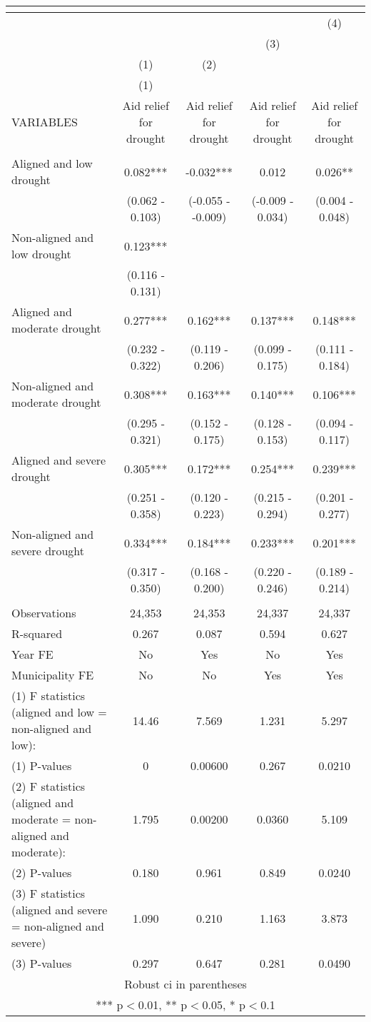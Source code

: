 \begin{tabular}{lcccc}
\multicolumn{5}{c}{} \\ \hline
 &  &  &  & (4) \\
 &  &  & (3) &  \\
 & (1) & (2) &  &  \\
 & (1) &  &  &  \\
VARIABLES & Aid relief for drought & Aid relief for drought & Aid relief for drought & Aid relief for drought \\ \hline
 &  &  &  &  \\
Aligned and low drought & 0.082*** & -0.032*** & 0.012 & 0.026** \\
 & (0.062 - 0.103) & (-0.055 - -0.009) & (-0.009 - 0.034) & (0.004 - 0.048) \\
Non-aligned and low drought & 0.123*** &  &  &  \\
 & (0.116 - 0.131) &  &  &  \\
Aligned and moderate drought & 0.277*** & 0.162*** & 0.137*** & 0.148*** \\
 & (0.232 - 0.322) & (0.119 - 0.206) & (0.099 - 0.175) & (0.111 - 0.184) \\
Non-aligned and moderate drought & 0.308*** & 0.163*** & 0.140*** & 0.106*** \\
 & (0.295 - 0.321) & (0.152 - 0.175) & (0.128 - 0.153) & (0.094 - 0.117) \\
Aligned and severe drought & 0.305*** & 0.172*** & 0.254*** & 0.239*** \\
 & (0.251 - 0.358) & (0.120 - 0.223) & (0.215 - 0.294) & (0.201 - 0.277) \\
Non-aligned and severe drought & 0.334*** & 0.184*** & 0.233*** & 0.201*** \\
 & (0.317 - 0.350) & (0.168 - 0.200) & (0.220 - 0.246) & (0.189 - 0.214) \\
 &  &  &  &  \\
Observations & 24,353 & 24,353 & 24,337 & 24,337 \\
R-squared & 0.267 & 0.087 & 0.594 & 0.627 \\
Year FE & No & Yes & No & Yes \\
Municipality FE & No & No & Yes & Yes \\
(1) F statistics (aligned and low = non-aligned and low): & 14.46 & 7.569 & 1.231 & 5.297 \\
(1) \hspace{1mm} P-values & 0 & 0.00600 & 0.267 & 0.0210 \\
(2) F statistics (aligned and moderate = non-aligned and moderate): & 1.795 & 0.00200 & 0.0360 & 5.109 \\
(2) \hspace{1mm} P-values & 0.180 & 0.961 & 0.849 & 0.0240 \\
(3) F statistics (aligned and severe = non-aligned and severe) & 1.090 & 0.210 & 1.163 & 3.873 \\
 (3) \hspace{1mm} P-values & 0.297 & 0.647 & 0.281 & 0.0490 \\ \hline
\multicolumn{5}{c}{ Robust ci in parentheses} \\
\multicolumn{5}{c}{ *** p$<$0.01, ** p$<$0.05, * p$<$0.1} \\
\end{tabular}
